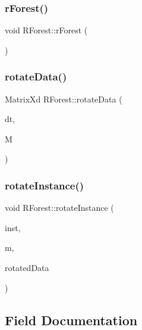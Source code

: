 \mbox{\label{classRForest_af91b647289cd5631389cefbc2612f4b3}} 
\subsubsection{\texorpdfstring{r\+Forest()}{rForest()}}
{\footnotesize\ttfamily void R\+Forest\+::r\+Forest (\begin{DoxyParamCaption}{ }\end{DoxyParamCaption})}

\mbox{\label{classRForest_af149cda8d70a254ff0968d350f85b59d}} 
\subsubsection{\texorpdfstring{rotate\+Data()}{rotateData()}}
{\footnotesize\ttfamily Matrix\+Xd R\+Forest\+::rotate\+Data (\begin{DoxyParamCaption}\item[{doubleframe $\ast$}]{dt,  }\item[{Eigen\+::\+Matrix\+Xd \&}]{M }\end{DoxyParamCaption})}

\mbox{\label{classRForest_a068f39ee76aa3ece35f110975303f07b}} 
\subsubsection{\texorpdfstring{rotate\+Instance()}{rotateInstance()}}
{\footnotesize\ttfamily void R\+Forest\+::rotate\+Instance (\begin{DoxyParamCaption}\item[{double $\ast$}]{inst,  }\item[{Eigen\+::\+Matrix\+Xd \&}]{m,  }\item[{double $\ast$}]{rotated\+Data }\end{DoxyParamCaption})}



\subsection{Field Documentation}
\mbox{\label{classRForest_ae42cae6b10ed270d226dc2871a1b4c5a}} 
